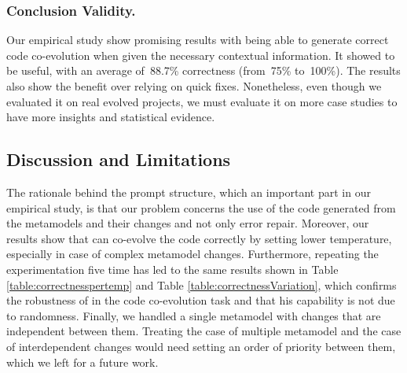 \subsubsection{Conclusion Validity.}

Our empirical study show promising results with \LLM being able to generate correct code co-evolution when given the necessary contextual information. It showed to be useful, with an average of~88.7\% correctness (from~75\% to~100\%). The results also show the benefit over relying on quick fixes. Nonetheless, even though we evaluated it on real evolved projects, we must evaluate it on more case studies to have more insights and statistical evidence.  %

\subsection{Discussion and Limitations}
The rationale behind the prompt structure, which an important part in our empirical study, is that our problem concerns the use of the code generated from the metamodels and their changes and not only error repair. Moreover, our results show that \LLM can co-evolve the code correctly by setting lower temperature, especially in case of complex metamodel changes. Furthermore, repeating the experimentation five time has led to the same results shown in Table \ref{table:correctnesspertemp} and Table \ref{table:correctnessVariation}, which confirms the robustness of \LLM in the code co-evolution task and that his capability is not due to randomness.
Finally, we handled a single metamodel with changes that are independent between them. Treating the case of multiple metamodel and the case of interdependent changes would need setting an order of priority between them, which we left for a future work.

